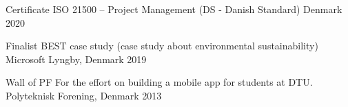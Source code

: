 





\begin{cvhonors}

  \cvhonor
    {Certificate} %
    {ISO 21500 – Project Management (DS - Danish Standard)} %
    {Denmark} %
    {2020} %

  \cvhonor
    {Finalist} %
    {BEST case study (case study about environmental sustainability)} %
    {Microsoft Lyngby, Denmark} %
    {2019} %

  \cvhonor
    {Wall of PF} %
    {For the effort on building a mobile app for students at DTU.} %
    {Polyteknisk Forening, Denmark} %
    {2013} %

%
%
%
%

\end{cvhonors}

